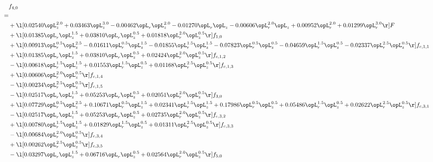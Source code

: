 \begin{alignat}{2} 
\label{eq:f_40_1} 
& f_{4,0} \nonumber \\ 
 = \\ 
& + \l[  0.02540 \opL_z^{2.0} +  0.03463 \opL_z^{3.0}   -0.00462 \opL_r \opL_z^{2.0}   -0.01270 \opL_r \opL_z   -0.00606 \opL_r^{2.0} \opL_z +  0.00952 \opL_r^{2.0} +  0.01299 \opL_r^{3.0}  \r] F \nonumber \\ 
& + \l[  0.01385 \opL_r \opL_z^{1.5} +  0.03810 \opL_r \opL_z^{0.5} +  0.01818 \opL_r^{2.0} \opL_z^{0.5}  \r] f_{1,0} \nonumber \\ 
& + \l[  0.00913 \opL_r^{0.5} \opL_z^{2.5}   -0.01611 \opL_r^{0.5} \opL_z^{1.5}   -0.01855 \opL_r^{1.5} \opL_z^{1.5}   -0.07823 \opL_r^{0.5} \opL_z^{0.5}   -0.04659 \opL_r^{1.5} \opL_z^{0.5}   -0.02337 \opL_r^{2.5} \opL_z^{0.5}  \r] f_{c,1,1} \nonumber \\ 
& + \l[  0.01385 \opL_r \opL_z^{1.5} +  0.03810 \opL_r \opL_z^{0.5} +  0.02424 \opL_r^{2.0} \opL_z^{0.5}  \r] f_{c,1,2} \nonumber \\ 
& - \l[  0.00618 \opL_r^{1.5} \opL_z^{1.5} +  0.01553 \opL_r^{1.5} \opL_z^{0.5} +  0.01168 \opL_r^{2.5} \opL_z^{0.5}  \r] f_{c,1,3} \nonumber \\ 
& + \l[  0.00606 \opL_r^{2.0} \opL_z^{0.5}  \r] f_{c,1,4} \nonumber \\ 
& - \l[  0.00234 \opL_r^{2.5} \opL_z^{0.5}  \r] f_{c,1,5} \nonumber \\ 
& - \l[  0.02517 \opL_r \opL_z^{1.5} +  0.05253 \opL_r \opL_z^{0.5} +  0.02051 \opL_r^{2.0} \opL_z^{0.5}  \r] f_{3,0} \nonumber \\ 
& + \l[  0.07729 \opL_r^{0.5} \opL_z^{2.5} +  0.10671 \opL_r^{0.5} \opL_z^{1.5} +  0.02341 \opL_r^{1.5} \opL_z^{1.5} +  0.17986 \opL_r^{0.5} \opL_z^{0.5} +  0.05486 \opL_r^{1.5} \opL_z^{0.5} +  0.02622 \opL_r^{2.5} \opL_z^{0.5}  \r] f_{c,3,1} \nonumber \\ 
& - \l[  0.02517 \opL_r \opL_z^{1.5} +  0.05253 \opL_r \opL_z^{0.5} +  0.02735 \opL_r^{2.0} \opL_z^{0.5}  \r] f_{c,3,2} \nonumber \\ 
& + \l[  0.00780 \opL_r^{1.5} \opL_z^{1.5} +  0.01829 \opL_r^{1.5} \opL_z^{0.5} +  0.01311 \opL_r^{2.5} \opL_z^{0.5}  \r] f_{c,3,3} \nonumber \\ 
& - \l[  0.00684 \opL_r^{2.0} \opL_z^{0.5}  \r] f_{c,3,4} \nonumber \\ 
& + \l[  0.00262 \opL_r^{2.5} \opL_z^{0.5}  \r] f_{c,3,5} \nonumber \\ 
& - \l[  0.03297 \opL_r \opL_z^{1.5} +  0.06716 \opL_r \opL_z^{0.5} +  0.02564 \opL_r^{2.0} \opL_z^{0.5}  \r] f_{5,0} \nonumber \\ 

\end{alignat}
